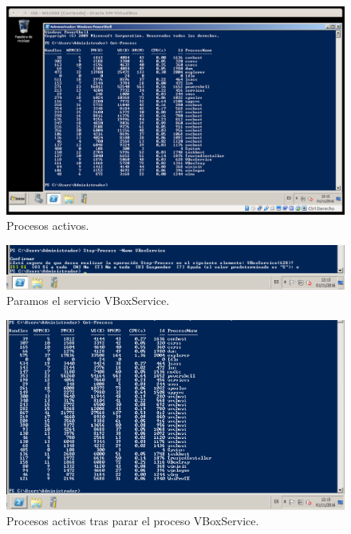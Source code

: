 \documentclass[a4paper,titlepage,12pt]{scrartcl}	%
\numberwithin{figure}{section} %
\numberwithin{table}{section} %
\begin{document}
	\begin{figure}[H]
		\centering
		\includegraphics[scale=0.39]{./Imagenes/17-getprocess.png}
		\caption[Procesos activos.]{Procesos activos.}
		\label{17-getprocess}
	\end{figure}
	
	\begin{figure}[H]
		\includegraphics[width=\linewidth]{./Imagenes/17-stopprocess.png}
		\vspace{-0.5cm}
		\caption[Paramos el servicio VBoxService.]{Paramos el servicio VBoxService.}
		\label{17-stopprocess}
	\end{figure}
	
	\begin{figure}[H]
		\includegraphics[width=\linewidth]{./Imagenes/17-getprocess2.png}
		\vspace{-0.5cm}
		\caption[Procesos activos tras parar el proceso VBoxService.]{Procesos activos tras parar el proceso VBoxService.}
		\label{17-getprocess2}
	\end{figure}
	
\end{document}
